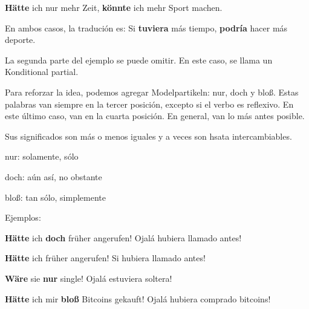 \textbf{Hätte} ich nur mehr Zeit, \textbf{könnte} ich mehr Sport machen.

En ambos casos, la tradución es: Si \textbf{tuviera} más tiempo, \textbf{podría} hacer más deporte. 

La segunda parte del ejemplo se puede omitir. En este caso, se llama un Konditional partial.

Para reforzar la idea, podemos agregar Modelpartikeln: nur, doch y bloß.
Estas palabras van siempre en la tercer posición, excepto si el verbo es reflexivo. En este último caso, van en la cuarta posición. En general, van lo más antes posible.

Sus significados son más o menos iguales y a veces son hsata intercambiables. 
\begin{myitemize}
\item nur: solamente, sólo
\item doch: aún así, no obstante
\item bloß: tan sólo, simplemente
\end{myitemize}

Ejemplos:

\textbf{Hätte} ich \textbf{doch} früher angerufen! Ojalá hubiera llamado antes!

\textbf{Hätte} ich früher angerufen! Si hubiera llamado antes!

\textbf{Wäre} sie \textbf{nur} single! Ojalá estuviera soltera!

\textbf{Hätte} ich mir \textbf{bloß} Bitcoins gekauft! Ojalá hubiera comprado bitcoins!

